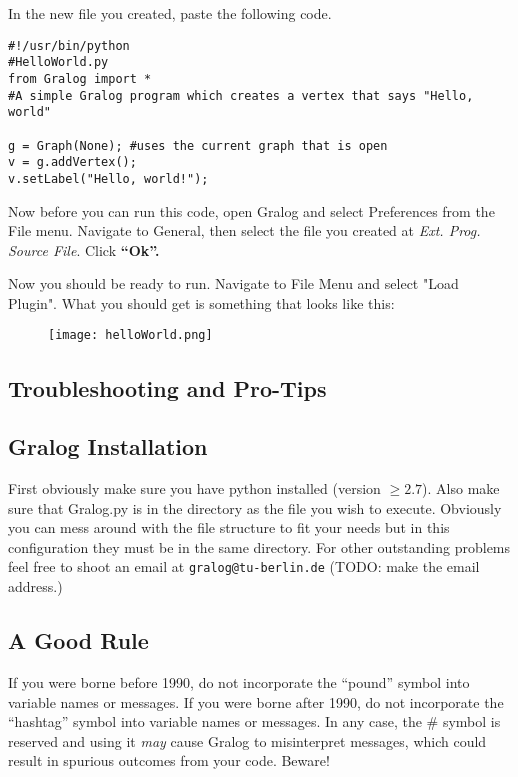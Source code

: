 \documentclass{article}
\begin{document}
In the new file you created, paste the following code.


\begin{lstlisting}[title={Code Snippet 1},label=codeSnippet1]
#!/usr/bin/python
#HelloWorld.py
from Gralog import *
#A simple Gralog program which creates a vertex that says "Hello, world"

g = Graph(None); #uses the current graph that is open
v = g.addVertex();
v.setLabel("Hello, world!");
\end{lstlisting}

Now before you can run this code, open Gralog and select Preferences from the File menu. Navigate to General, then select the file you created at \emph{Ext. Prog. Source File}. Click \textbf{``Ok''.}

Now you should be ready to run. Navigate to File Menu and select "Load Plugin". What you should get is something that looks like this: 

\begin{figure}[H]
\centering
\texttt{[image: helloWorld.png]}
\end{figure}


\subsection{Troubleshooting and Pro-Tips}
\subsection{Gralog Installation}
First obviously make sure you have python installed (version $\ge
2.7$). Also make sure that Gralog.py is in the directory as the file you
wish to execute. Obviously you can mess around with the file structure
to fit your needs but in this configuration they must be in the same
directory. For other outstanding problems feel free to shoot an email
at \texttt{gralog@tu-berlin.de} (TODO: make the email address.)

\subsection{A Good Rule}
If you were borne before 1990, do not incorporate the "`pound"' symbol into variable names or messages. If you were borne after 1990, do not incorporate the "`hashtag"' symbol into variable names or messages. In any case, the \# symbol is reserved and using it \textit{may} cause Gralog to misinterpret messages, which could result in spurious outcomes from your code. Beware!
\end{document}
